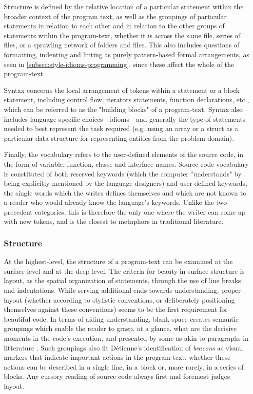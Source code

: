 Structure is defined by the relative location of a particular statement within the broader context of the program text, as well as the groupings of particular statements in relation to each other and in relation to the other groups of statements within the program-text, whether it is across the same file, series of files, or a sprawling network of folders and files. This also includes questions of formatting, indenting and linting as purely pattern-based formal arrangements, as seen in \ref{subsec:style-idioms-programming}, since these affect the whole of the program-text.

Syntax concerns the local arrangement of tokens within a statement or a block statement, including control flow, iterators statements, function declarations, etc., which can be referred to as the "building blocks" of a program-text. Syntax also includes language-specific choices—idioms—and generally the type of statements needed to best represent the task required (e.g. using an array or a struct as a particular data structure for representing entities from the problem domain).

Finally, the vocabulary refers to the user-defined elements of the source code, in the form of variable, function, classe and interface names. Source code vocabulary is constituted of both reserved keywords (which the computer "understands" by being explicitly mentioned by the language designers) and user-defined keywords, the single words which the writes defines themselves and which are not known to a reader who would already know the language's keywords. Unlike the two precedent categories, this is therefore the only one where the writer can come up with new tokens, and is the closest to metaphors in traditional literature.

\subsubsection{Structure}
\label{subsubsec:framework-structure}

At the highest-level, the structure of a program-text can be examined at the surface-level and at the deep-level. The criteria for beauty in surface-structure is layout, as the spatial organization of statements, through the use of line breaks and indentations. While serving additional ends towards understanding, proper layout (whether according to stylistic conventions, or deliberately positioning themselves against these conventions) seems to be the first requirement for beautiful code. In terms of aiding understanding, blank space creates semantic groupings which enable the reader to grasp, at a glance, what are the decisive moments \citep{sennett_craftsman_2009} in the code's execution, and presented by some as akin to paragraphs in litterature \citep{matsumoto_treating_2007}. Such groupings also fit Détienne's identification of \emph{beacons} \citep{detienne_software_2012} as visual markers that indicate important actions in the program text, whether these actions can be described in a single line, in a block or, more rarely, in a series of blocks. Any cursory reading of source code always first and foremost judges layout.

